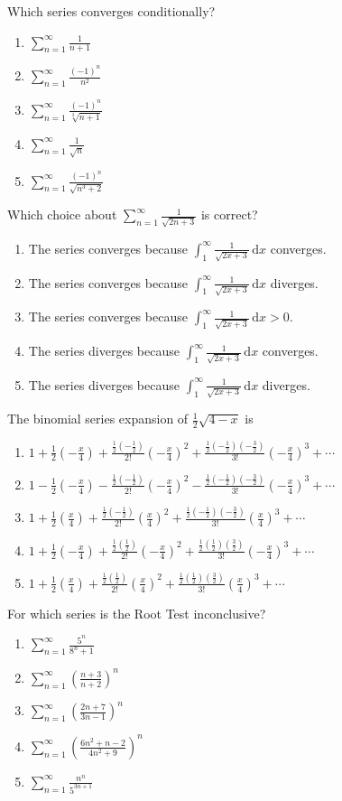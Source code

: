 \documentclass[letterstyle,12pt]{extarticle}
\newcounter{qcounter}
\newcommand{\di}{\, \text{d}}
\newcommand{\choices}[5]{
\vspace{0.8em} 
\begin{enumerate}[label=(\Alph*)]
\setlength\itemsep{1em} 
\item
#1 
\item 
#2
\item
#3
\item
#4
\item
#5
\end{enumerate}
}
\newcommand{\ans}[1]{{\color{black} #1}}
\newenvironment{question}
    {\begin{minipage}{0.9 \textwidth}
        \item
    }
    { 
    \end{minipage} \vspace{4ex}
    }
\begin{document}
\begin{list}{\textbf{.}~}{}
\begin{question}
Which series converges conditionally?
\choices
{\(\sum_{n = 1}^\infty \frac{1}{n + 1}\)}
{\(\sum_{n = 1}^\infty \frac{(-1)^n}{n^2}\)}
{\ans{\(\sum_{n = 1}^\infty \frac{(-1)^n}{\sqrt[3]{n + 1}}\)}}
{\(\sum_{n = 1}^\infty \frac{1}{\sqrt{n}}\)}
{\(\sum_{n = 1}^\infty \frac{(-1)^n}{\sqrt{n^3 + 2}}\)}
\end{question}


\begin{question}
Which choice about \(\sum_{n = 1}^\infty \frac{1}{\sqrt{2n + 3}}\) is correct?
\choices
{The series converges because \(\int_1^\infty \frac{1}{\sqrt{2x + 3}} \di x\) converges.}
{The series converges because \(\int_1^\infty \frac{1}{\sqrt{2x + 3}} \di x\) diverges.} 
{The series converges because \(\int_1^\infty \frac{1}{\sqrt{2x + 3}} \di x > 0.\)}
{The series diverges because \(\int_1^\infty \frac{1}{\sqrt{2x + 3}} \di x\) converges.} 
{\ans{The series diverges because \(\int_1^\infty \frac{1}{\sqrt{2x + 3}} \di x\) diverges.}}
\end{question}

\begin{question}
The binomial series expansion of \(\frac{1}{2} \sqrt{4 - x}\) is 
\choices
{\ans{\(1 + \frac{1}{2} \left(-\frac{x}{4}\right) + \frac{\frac{1}{2} \left(-\frac{1}{2}\right)}{2!} \left(-\frac{x}{4}\right)^2 + \frac{\frac{1}{2} \left(-\frac{1}{2}\right) \left(-\frac{3}{2}\right)}{3!} \left(-\frac{x}{4}\right)^3 + \cdots\)}}
{\(1 - \frac{1}{2} \left(-\frac{x}{4}\right) - \frac{\frac{1}{2} \left(-\frac{1}{2}\right)}{2!} \left(-\frac{x}{4}\right)^2 - \frac{\frac{1}{2} \left(-\frac{1}{2}\right) \left(-\frac{3}{2}\right)}{3!} \left(-\frac{x}{4}\right)^3 + \cdots\)}
{\(1 + \frac{1}{2} \left(\frac{x}{4}\right) + \frac{\frac{1}{2} \left(-\frac{1}{2}\right)}{2!} \left(\frac{x}{4}\right)^2 + \frac{\frac{1}{2} \left(-\frac{1}{2}\right) \left(-\frac{3}{2}\right)}{3!} \left(\frac{x}{4}\right)^3 + \cdots\)}
{\(1 + \frac{1}{2} \left(-\frac{x}{4}\right) + \frac{\frac{1}{2} \left(\frac{1}{2}\right)}{2!} \left(-\frac{x}{4}\right)^2 + \frac{\frac{1}{2} \left(\frac{1}{2}\right) \left(\frac{3}{2}\right)}{3!} \left(-\frac{x}{4}\right)^3 + \cdots\)}
{\(1 + \frac{1}{2} \left(\frac{x}{4}\right) + \frac{\frac{1}{2} \left(\frac{1}{2}\right)}{2!} \left(\frac{x}{4}\right)^2 + \frac{\frac{1}{2} \left(\frac{1}{2}\right) \left(\frac{3}{2}\right)}{3!} \left(\frac{x}{4}\right)^3 + \cdots\)}
\end{question}

\begin{question}
For which series is the Root Test inconclusive?
\choices
{\(\sum_{n = 1}^\infty \frac{5^n}{8^n + 1}\)}
{\ans{\(\sum_{n = 1}^\infty \left(\frac{n + 3}{n + 2}\right)^n\)}}
{\(\sum_{n = 1}^\infty \left(\frac{2n + 7}{3n - 1}\right)^n\)}
{\(\sum_{n = 1}^\infty \left(\frac{6n^2 + n - 2}{4n^2 + 9}\right)^n\)}
{\(\sum_{n = 1}^\infty \frac{n^n}{5^{3n + 1}}\)}
\end{question}


\end{list}
\end{document}
